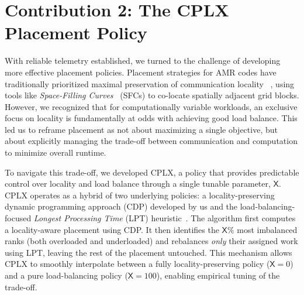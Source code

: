 \section{Contribution 2: The CPLX Placement Policy}
With reliable telemetry established, we turned to the challenge of developing more effective
placement policies.
Placement strategies for AMR codes have traditionally prioritized maximal preservation of
communication locality
~\cite{Warre1993:ParallelHashedOctTree,Sasid2015:GeneralSpacefillingCurve,Bhate2011:ApplyingGraphPartitioning,Catal2007:Zoltan,Lasal2013:parMETIS},
using tools like \emph{Space-Filling Curves}~\cite{Burst2011:p4est} (SFCs) to co-locate spatially
adjacent grid blocks.
However, we recognized that for computationally variable workloads, an exclusive focus on locality
is fundamentally at odds with achieving good load balance.
This led us to reframe placement as not about maximizing a single objective, but about explicitly
managing the trade-off between communication and computation to minimize overall runtime.

To navigate this trade-off, we developed CPLX, a policy that provides predictable control over
locality and load balance through a single tunable parameter, $\mathsf{X}$.
CPLX operates as a hybrid of two underlying policies: a locality-preserving dynamic programming
approach (CDP) developed by us and the load-balancing-focused \emph{Longest Processing Time} (LPT)
heuristic~\cite{Graha1969:LPT}.
The algorithm first computes a locality-aware placement using CDP.
It then identifies the $\mathsf{X}\%$ most imbalanced ranks (both overloaded and underloaded) and
rebalances \emph{only} their assigned work using LPT, leaving the rest of the placement untouched.
This mechanism allows CPLX to smoothly interpolate between a fully locality-preserving policy
($\mathsf{X}=0$) and a pure load-balancing policy ($\mathsf{X}=100$), enabling empirical tuning of
the trade-off.


